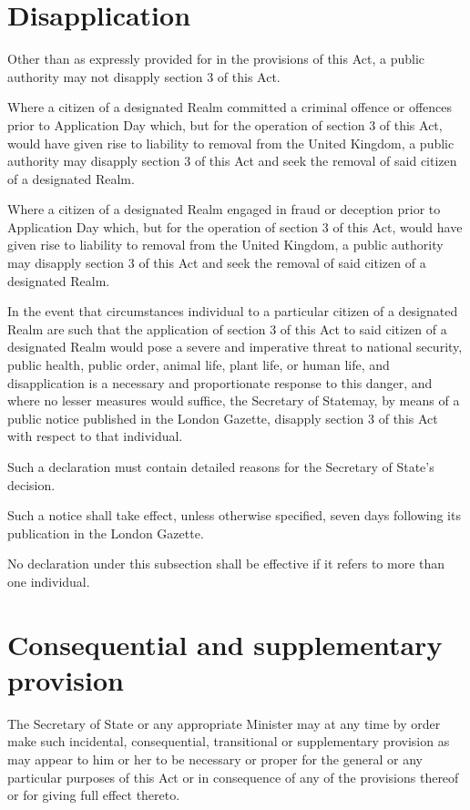 \documentclass{ukbill}
\begin{document}
\section{Disapplication}
\begin{numstat}
	\item Other than as expressly provided for in the provisions of this Act, a public authority may not disapply section 3 of this Act.
	\item 	Where a citizen of a designated Realm committed a criminal offence or offences prior to Application Day which, but for the operation of section 3 of this Act, would have given rise to liability to removal from the United Kingdom, a public authority may disapply section 3 of this Act and seek the removal of said citizen of a designated Realm.
	\item 	Where a citizen of a designated Realm engaged in fraud or deception prior to Application Day which, but for the operation of section 3 of this Act, would have given rise to liability to removal from the United Kingdom, a public authority may disapply section 3 of this Act and seek the removal of said citizen of a designated Realm.
	\item In the event that circumstances individual to a particular citizen of a designated Realm are such that the application of section 3 of this Act to said citizen of a designated Realm would pose a severe and imperative threat to national security, public health, public order, animal life, plant life, or human life, and disapplication is a necessary and proportionate response to this danger, and where no lesser measures would suffice, the Secretary of Statemay, by means of a public notice published in the London Gazette, disapply section 3 of this Act  with respect to that individual.\begin{alphstat}
	\item Such a declaration must contain detailed reasons for the Secretary of State's decision. 
	\item Such a notice shall take effect, unless otherwise specified,  seven days following  its publication in the London Gazette.
	\item No declaration under this subsection shall be effective if it refers to more than one individual.
\end{alphstat}
\end{numstat}

\section{Consequential and supplementary provision}
\begin{nostat}
\item The Secretary of State or any appropriate Minister may at any time by order make such incidental, consequential, transitional or supplementary provision as may appear to him or her to be necessary or proper for the general or any particular purposes of this Act or in consequence of any of the provisions thereof or for giving full effect thereto.
\end{nostat}	
\end{document}

